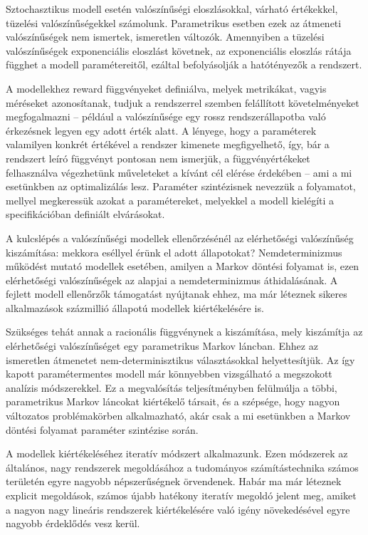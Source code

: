 Sztochasztikus modell esetén valószínűségi eloszlásokkal, várható értékekkel, tüzelési valószínűségekkel számolunk. Parametrikus esetben ezek az átmeneti valószínűségek nem ismertek, ismeretlen változók. Amennyiben a  tüzelési valószínűségek exponenciális eloszlást követnek, az exponenciális eloszlás rátája függhet a modell paramétereitől, ezáltal befolyásolják a hatótényezők a rendszert.

A modellekhez reward függvényeket definiálva, melyek metrikákat, vagyis méréseket azonosítanak, tudjuk a rendszerrel szemben felállított követelményeket megfogalmazni -- például a valószínűsége egy rossz rendszerállapotba való érkezésnek legyen egy adott érték alatt. A lényege, hogy a paraméterek valamilyen konkrét értékével a rendszer kimenete megfigyelhető, így, bár a rendszert leíró függvényt pontosan nem ismerjük, a függvényértékeket felhasználva végezhetünk műveleteket a kívánt cél elérése érdekében -- ami a mi esetünkben az optimalizálás lesz. Paraméter szintézisnek nevezzük a folyamatot, mellyel megkeressük azokat a paramétereket, melyekkel a modell kielégíti a specifikációban definiált elvárásokat.

A kulcslépés a valószínűségi modellek ellenőrzésénél az elérhetőségi valószínűség kiszámítása: mekkora eséllyel érünk el adott állapotokat? Nemdeterminizmus működést mutató modellek esetében, amilyen a Markov döntési folyamat is, ezen elérhetőségi valószínűségek az alapjai a nemdeterminizmus áthidalásának. A fejlett modell ellenőrzők támogatást nyújtanak ehhez, ma már léteznek sikeres alkalmazások százmillió állapotú modellek kiértékelésére is.

Szükséges tehát annak a racionális függvénynek a kiszámítása, mely kiszámítja az elérhetőségi valószínűséget egy parametrikus Markov láncban.
Ehhez az ismeretlen átmenetet nem-determinisztikus választásokkal helyettesítjük. Az így kapott paramétermentes modell már könnyebben vizsgálható a megszokott analízis módszerekkel. Ez a megvalósítás teljesítményben felülmúlja a többi, parametrikus Markov láncokat kiértékelő társait, és a szépsége, hogy nagyon változatos problémakörben alkalmazható, akár csak a mi esetünkben a Markov döntési folyamat paraméter szintézise során.\cite{ParameterSzintezisCikk}

A modellek kiértékeléséhez iteratív módszert alkalmazunk. Ezen módszerek az általános, nagy %
rendszerek megoldásához a tudományos számítástechnika számos területén egyre nagyobb népszerűségnek örvendenek. Habár ma már léteznek explicit megoldások, számos újabb hatékony iteratív megoldó %
jelent meg, amiket a nagyon nagy lineáris rendszerek kiértékelésére való igény növekedésével egyre nagyobb érdeklődés vesz kerül.

